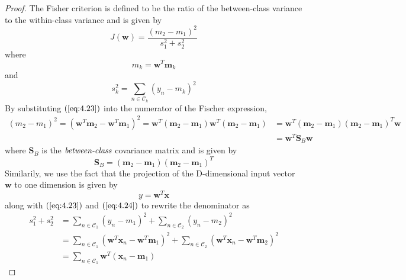 \begin{proof}
    The Fisher criterion is defined to be the ratio of the between-class
    variance to the within-class variance and is given by
    \begin{equation*}
        J(\mathbf{w}) = \frac{(m_2 - m_1)^2}{s_1^2 + s_2^2}
        \tag{4.25}\label{eq:4.25}
    \end{equation*}
    where 
    \begin{equation*}
        m_k = \mathbf{w}^T\mathbf{m}_k
        \tag{4.23}\label{eq:4.23}
    \end{equation*}
    and
    \begin{equation*}
        s_k^2 = \sum_{n \in \mathcal{C}_k} (y_n - m_k)^2
        \tag{4.24}\label{eq:4.24}
    \end{equation*}
    By substituting $(\ref{eq:4.23})$ into the numerator of the Fischer expression,
    \begin{align*}
        (m_2 - m_1)^2 
        = (\mathbf{w}^T\mathbf{m}_2 - \mathbf{w}^T\mathbf{m}_1)^2
        = \mathbf{w}^T(\mathbf{m}_2 - \mathbf{m}_1)\mathbf{w}^T(\mathbf{m}_2 - \mathbf{m}_1)
        &= \mathbf{w}^T(\mathbf{m}_2 - \mathbf{m}_1)(\mathbf{m}_2 - \mathbf{m}_1)^T\mathbf{w} \\
        &= \mathbf{w}^T\mathbf{S}_B\mathbf{w}
    \end{align*}
    where $\mathbf{S}_B$ is the $\emph{between-class}$ covariance matrix and is given by
    \begin{equation*}
        \mathbf{S}_B = (\mathbf{m}_2 - \mathbf{m}_1)(\mathbf{m}_2 - \mathbf{m}_1)^T
        \tag{4.27}\label{eq:4.27}
    \end{equation*}
    Similarily, we use the fact that the projection of the D-dimensional input vector
    $\mathbf{w}$ to one dimension is given by
    \begin{equation*}
        y = \mathbf{w}^T\mathbf{x}
        \tag{4.20}\label{eq:4.20}
    \end{equation*}
    along with $(\ref{eq:4.23})$ and $(\ref{eq:4.24})$ to rewrite the denominator as 
    \begin{align*}
        s_1^2 + s_2^2
        &= \sum_{n \in \mathcal{C}_1} (y_n - m_1)^2 + \sum_{n \in \mathcal{C}_2} (y_n - m_2)^2 \\
        &= \sum_{n \in \mathcal{C}_1} (\mathbf{w}^T\mathbf{x}_n - \mathbf{w}^T\mathbf{m}_1)^2 
            + \sum_{n \in \mathcal{C}_2} (\mathbf{w}^T\mathbf{x}_n - \mathbf{w}^T\mathbf{m}_2)^2 \\
        &= \sum_{n \in \mathcal{C}_1} \mathbf{w}^T(\mathbf{x}_n - \mathbf{m}_1)

\end{align*}
\end{proof}

